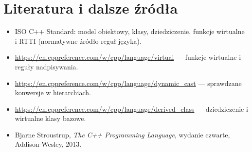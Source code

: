 \section*{Literatura i dalsze źródła}
\begin{itemize}
\item ISO C++ Standard: model obiektowy, klasy, dziedziczenie,
      funkcje wirtualne i RTTI (normatywne źródło reguł języka).
\item \url{https://en.cppreference.com/w/cpp/language/virtual}
      --- funkcje wirtualne i reguły nadpisywania.
\item \url{https://en.cppreference.com/w/cpp/language/dynamic_cast}
      --- sprawdzane konwersje w hierarchiach.
\item \url{https://en.cppreference.com/w/cpp/language/derived_class}
      --- dziedziczenie i wirtualne klasy bazowe.
\item Bjarne Stroustrup, \emph{The C++ Programming Language},
      wydanie czwarte, Addison-Wesley, 2013.
\end{itemize}
